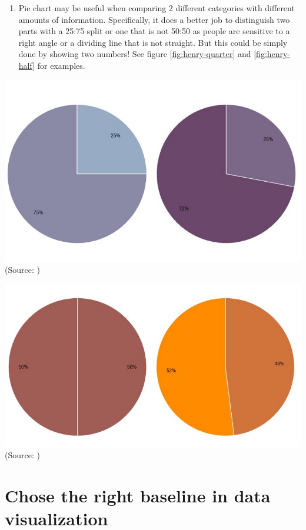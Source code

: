 \documentclass[]{book}
\providecommand{\tightlist}{%
  \setlength{\itemsep}{0pt}\setlength{\parskip}{0pt}}
\theoremstyle{definition}
\theoremstyle{definition}
\theoremstyle{definition}
\theoremstyle{remark}
\begin{document}
\begin{enumerate}
\def\labelenumi{\arabic{enumi}.}
\setcounter{enumi}{3}
\tightlist
\item
  Pie chart may be useful when comparing 2 different categories with
  different amounts of information. Specifically, it does a better job
  to distinguish two parts with a 25:75 split or one that is not 50:50
  as people are sensitive to a right angle or a dividing line that is
  not straight. But this could be simply done by showing two numbers!
  See figure \ref{fig:henry-quarter} and \ref{fig:henry-half} for
  examples.
\end{enumerate}

\includegraphics{images/henry-quarter.png} (Source:
\citep{henry-defense-pie})

\includegraphics{images/henry-half.png} (Source:
\citep{henry-defense-pie})

\section{Chose the right baseline in data
visualization}\label{chose-the-right-baseline-in-data-visualization}
\end{document}

